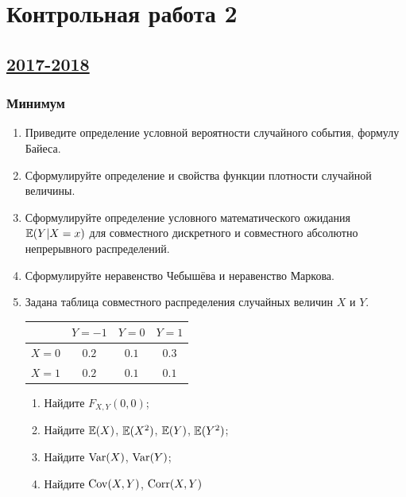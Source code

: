\newpage
\thispagestyle{empty}
\section{Контрольная работа 2}



\subsection[2017-2018]{\hyperref[sec:sol_kr_02_2017_2018]{2017-2018}}
\label{sec:kr_02_2017_2018}

\subsubsection*{Минимум}

\begin{enumerate}
\item Приведите определение условной вероятности случайного события, формулу Байеса.
\item Сформулируйте определение и свойства функции плотности случайной величины.
\item Сформулируйте определение  условного математического ожидания $\operatorname{\mathbb{E}}(Y|X=x)$ для совместного дискретного и совместного абсолютно непрерывного распределений.
\item Сформулируйте неравенство Чебышёва и неравенство Маркова.

\item Задана таблица совместного распределения случайных величин $X$ и $Y$.
\begin{center}
\begin{tabular}{lccc}
\toprule
                      & $Y=-1$  & $Y=0$   & $Y=1$   \\ \midrule
$X=0$                 & $0.2$ & $0.1$ & $0.3$ \\
$X=1$                 & $0.2$ & $0.1$ & $0.1$ \\
\bottomrule
\end{tabular}
\end{center}

\begin{enumerate}
    \item Найдите $F_{X,Y}(0, 0)$;
    \item Найдите $\operatorname{\mathbb{E}}(X)$, $\operatorname{\mathbb{E}}(X^2)$, $\operatorname{\mathbb{E}}(Y)$, $\operatorname{\mathbb{E}}(Y^2)$;
    \item Найдите $\operatorname{Var}(X)$, $\operatorname{Var}(Y)$;
    \item Найдите $\operatorname{Cov}(X, Y)$, $\operatorname{Corr}(X, Y)$
\end{enumerate}


\end{enumerate}
